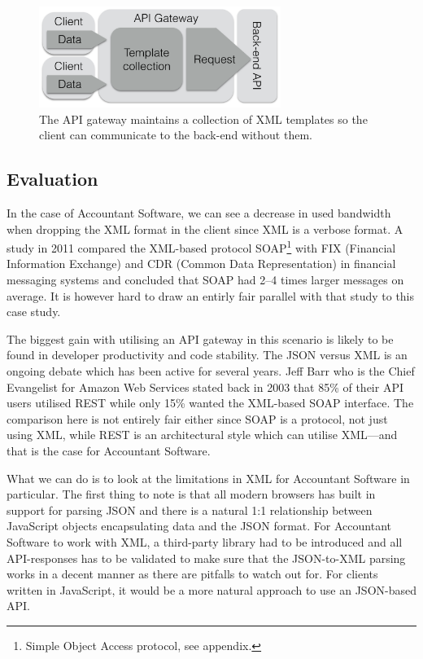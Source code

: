 \documentclass{cslthse-msc}
\begin{document}
\begin{figure}[H]
  \centering
    \begin{center}
      \includegraphics[width=0.7\textwidth]{images/gateway_templates.png}
    \end{center}
  \caption{The API gateway maintains a collection of XML templates so the client can communicate to the back-end without them.}
\end{figure}

\subsection{Evaluation}

In the case of Accountant Software, we can see a decrease in used bandwidth when dropping the XML format in the client since XML is a verbose format. A study in 2011 compared the XML-based protocol SOAP\footnote{Simple Object Access protocol, see appendix.} with FIX (Financial Information Exchange) and CDR (Common Data Representation) in financial messaging systems and concluded that SOAP had 2--4 times larger messages on average\cite{soap_fix}. It is however hard to draw an entirly fair parallel with that study to this case study.

The biggest gain with utilising an API gateway in this scenario is likely to be found in developer productivity and code stability. The JSON versus XML is an ongoing debate which has been active for several years. Jeff Barr who is the Chief Evangelist for Amazon Web Services stated back in 2003 that 85\% of their API users utilised REST while only 15\% wanted the XML-based SOAP interface\cite{soap_amazon}. The comparison here is not entirely fair either since SOAP is a protocol, not just using XML, while REST is an architectural style which can utilise XML---and that is the case for Accountant Software.

What we can do is to look at the limitations in XML for Accountant Software in particular. The first thing to note is that all modern browsers has built in support for parsing JSON and there is a natural 1:1 relationship between JavaScript objects encapsulating data and the JSON format. For Accountant Software to work with XML, a third-party library had to be introduced and all API-responses has to be validated to make sure that the JSON-to-XML parsing works in a decent manner as there are pitfalls to watch out for. For clients written in JavaScript, it would be a more natural approach to use an JSON-based API. 
\end{document}
